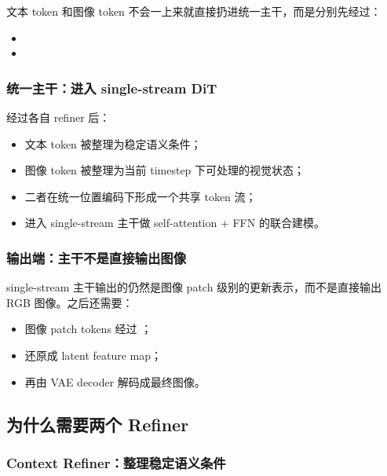 文本 token 和图像 token 不会一上来就直接扔进统一主干，而是分别先经过：

\begin{itemize}[leftmargin=1.5em]
  \item {}
  \item {}
\end{itemize}

\subsubsection{统一主干：进入 single-stream DiT}

经过各自 refiner 后：

\begin{itemize}[leftmargin=1.5em]
  \item 文本 token 被整理为稳定语义条件；
  \item 图像 token 被整理为当前 timestep 下可处理的视觉状态；
  \item 二者在统一位置编码下形成一个共享 token 流；
  \item 进入 single-stream 主干做 self-attention + FFN 的联合建模。
\end{itemize}

\subsubsection{输出端：主干不是直接输出图像}

single-stream 主干输出的仍然是图像 patch 级别的更新表示，而不是直接输出 RGB 图像。之后还需要：

\begin{itemize}[leftmargin=1.5em]
  \item 图像 patch tokens 经过 ；
  \item 还原成 latent feature map；
  \item 再由 VAE decoder 解码成最终图像。
\end{itemize}

\subsection{为什么需要两个 Refiner}

\subsubsection{Context Refiner：整理稳定语义条件}

